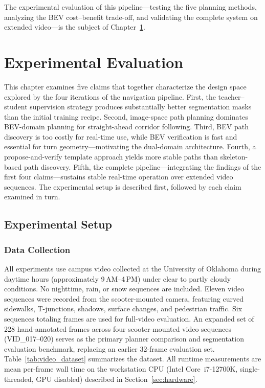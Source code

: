 \documentclass[12pt,letterpaper,oneside]{report}
\begin{document}
The experimental evaluation of this pipeline---testing the five planning methods, analyzing the BEV cost--benefit trade-off, and validating the complete system on extended video---is the subject of Chapter~\ref{ch:evaluation}.


\chapter{Experimental Evaluation}
\label{ch:evaluation}

This chapter examines five claims that together characterize the design space explored by the four iterations of the navigation pipeline.  First, the teacher--student supervision strategy produces substantially better segmentation masks than the initial training recipe.  Second, image-space path planning dominates BEV-domain planning for straight-ahead corridor following.  Third, BEV path discovery is too costly for real-time use, while BEV verification is fast and essential for turn geometry---motivating the dual-domain architecture.  Fourth, a propose-and-verify template approach yields more stable paths than skeleton-based path discovery.  Fifth, the complete pipeline---integrating the findings of the first four claims---sustains stable real-time operation over extended video sequences.  The experimental setup is described first, followed by each claim examined in turn.


\section{Experimental Setup}

\subsection{Data Collection}

All experiments use campus video collected at the University of Oklahoma during daytime hours (approximately 9\,AM--4\,PM) under clear to partly cloudy conditions.  No nighttime, rain, or snow sequences are included.  Eleven video sequences were recorded from the scooter-mounted camera, featuring curved sidewalks, T-junctions, shadows, surface changes, and pedestrian traffic. Six sequences totaling  frames are used for full-video evaluation.  An expanded set of 228 hand-annotated frames across four scooter-mounted video sequences (VID\_017--020) serves as the primary planner comparison and segmentation evaluation benchmark, replacing an earlier 32-frame evaluation set.  Table~\ref{tab:video_dataset} summarizes the dataset.  All runtime measurements are mean per-frame wall time on the workstation CPU (Intel Core~i7-12700K, single-threaded, GPU disabled) described in Section~\ref{sec:hardware}.
\end{document}
